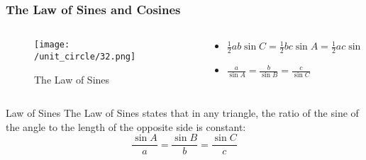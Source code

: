     \begin{frame}
    \frametitle{The Law of Sines and Cosines} 
    \begin{columns}
        \begin{column}{0.5\textwidth}
            \begin{figure}
                \centering
                \texttt{[image: /unit\_circle/32.png]}
                \caption{The Law of Sines}
            \end{figure}
        \end{column}
        \begin{column}{0.5\textwidth}
            \begin{itemize}
                \item \( \frac{1}{2} ab \sin C = \frac{1}{2}bc\sin A = \frac{1}{2}ac\sin B\)
                \item \( \frac{a}{\sin A} = \frac{b}{\sin B} = \frac{c}{\sin C}\)
            \end{itemize}
        \end{column}
    \end{columns}
    \begin{block}{Law of Sines}
        The Law of Sines states that in any triangle, the ratio of the sine of the angle to the length of the opposite side is constant:
        \[
        \frac{\sin A}{a} = \frac{\sin B}{b} = \frac{\sin C}{c}
        \]
    \end{block}
    \end{frame}

